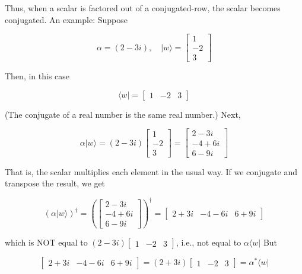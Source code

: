 \documentclass[main.tex]{subfiles}
\begin{document}
    Thus, when a scalar is factored out of a conjugated-row, the scalar becomes conjugated. An example: Suppose
    
    $$
    \alpha=(2-3 i), \quad|w\rangle=\left[\begin{array}{r}
    1 \\
    -2 \\
    3
    \end{array}\right]
    $$
    
    Then, in this case
    
    $$
    \langle w|=\left[\begin{array}{lll}
    1 & -2 & 3
    \end{array}\right]
    $$
    
    (The conjugate of a real number is the same real number.) Next,
    
    $$
    \alpha|w\rangle=(2-3 i)\left[\begin{array}{r}
    1 \\
    -2 \\
    3
    \end{array}\right]=\left[\begin{array}{r}
    2-3 i \\
    -4+6 i \\
    6-9 i
    \end{array}\right]
    $$
    
    That is, the scalar multiplies each element in the usual way. If we conjugate and transpose the result, we get
    
    $$
    (\alpha|w\rangle)^{\dagger}=\left(\left[\begin{array}{r}
    2-3 i \\
    -4+6 i \\
    6-9 i
    \end{array}\right]\right)^{\dagger}=\left[\begin{array}{lll}
    2+3 i & -4-6 i & 6+9 i
    \end{array}\right]
    $$
    
    which is NOT equal to $(2-3 i)\left[\begin{array}{lll}1 & -2 & 3\end{array}\right]$, i.e., not equal to $\alpha\langle w|$ But
    
    $$
    \left[\begin{array}{lll}
    2+3 i & -4-6 i & 6+9 i
    \end{array}\right]=(2+3 i)\left[\begin{array}{ccc}
    1 & -2 & 3
    \end{array}\right]=\alpha^{*}\langle w|
    $$
    
\end{document}
